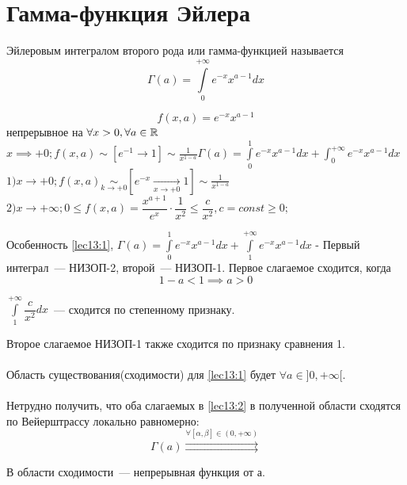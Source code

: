 \documentclass[../../main.tex]{subfiles}
\begin{document}

\section{Гамма-функция Эйлера}

Эйлеровым интегралом второго рода или гамма-функцией называется
\begin{equation}
\label{lec13:1}
\Gamma(a) = \int\limits_0^{+\infty}e^{-x}x^{a-1}dx
\end{equation}

\[
	f(x, a) = e^{-x}x^{a-1}
\]  непрерывное на $\forall x > 0, \forall a \in \mathbb{R}$
\\
$
	x \implies +0; f(x, a) \sim [e^{-1} \to 1] \sim \frac{1}{x^{1-a}}
	\Gamma(a) = \int\limits_0^1e^{-x}x^{a-1}dx + \int_0^{+\infty}e^{-x}x^{a-1}dx
$
\\
$
1) x \to + 0; f(x, a) \underset{k \to +0}\sim \left[ e^{-x} 
\underset{x \to +0} \to 1 \right] \sim \frac{1}{x^{1-a}}
$
\\
$
	2) x \to +\infty; 
	0 \le f(x, a) = \dfrac{x^{a+1}}{e^x} \cdot \dfrac{1}{x^2} \le \dfrac{c}{x^2}, 
	c=const \ge 0;
$

Особенность \eqref{lec13:1}, $\Gamma(a) = \int\limits_0^1 e^{-x} x^{a-1} dx +
\int\limits_1^{+\infty} e^{-x} x^{a-1} dx $ - 
Первый интеграл~--- НИЗОП-2, второй~--- НИЗОП-1. 
Первое слагаемое сходится, когда \begin{equation}
	\label{lec13:2}
	1 - a < 1 \implies a > 0
\end{equation}

$\int\limits_1^{+\infty}\dfrac{c}{x^2}dx$~--- сходится по степенному признаку.

Второе слагаемое НИЗОП-1 также сходится по признаку сравнения 1.
\\\\
Область существования(сходимости) для \eqref{lec13:1} будет $\forall a \in ]0, 
+\infty[$.
\\\\
Нетрудно получить, что оба слагаемых в \eqref{lec13:2} в полученной области 
сходятся по Вейерштрассу локально равномерно:
\[
\Gamma(a) \overset{\forall \left[ \alpha, \beta \right] \in (0, 
+\infty)}{\rightrightarrows}
\]

В области сходимости~--- непрерывная функция от а.
\end{document}
